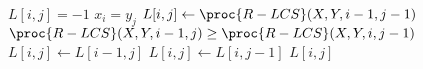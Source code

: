 \begin{codebox}
\li \If $L[i,j] = -1$
\li \Then
		\If $x_i = y_j$
\li 	\Then
			$L[i,j] \gets \proc{R-LCS}(X,Y,i-1,j-1)$
\li		\ElseIf $\proc{R-LCS}(X,Y,i-1,j) \geq \proc{R-LCS}(X,Y,i,j-1)$
\li		\Then
			$L[i,j] \gets L[i-1,j]$
\li		\ElseNoIf
\li			$L[i,j] \gets L[i,j-1]$
		\End
	\End
\li \Return $L[i,j]$
\end{codebox}